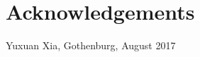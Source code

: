 \thispagestyle{plain}			%
\section*{Acknowledgements}


\vspace{1.5cm}
\hfill
Yuxuan Xia, Gothenburg, August 2017

\newpage				%
\thispagestyle{empty}
\mbox{}